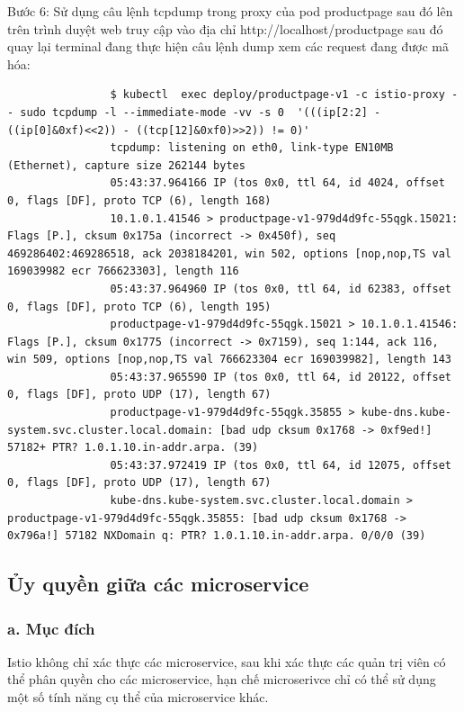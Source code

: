 \documentclass[12pt,a4paper]{report}
\begin{document}
{{				Bước 6: Sử dụng câu lệnh tcpdump trong proxy của pod productpage sau đó lên trên trình duyệt web truy cập vào địa chỉ http://localhost/productpage sau đó quay lại terminal đang thực hiện câu lệnh dump xem các request đang được mã hóa:
				\begin{lstlisting}
				$ kubectl  exec deploy/productpage-v1 -c istio-proxy -- sudo tcpdump -l --immediate-mode -vv -s 0  '(((ip[2:2] - ((ip[0]&0xf)<<2)) - ((tcp[12]&0xf0)>>2)) != 0)'
				tcpdump: listening on eth0, link-type EN10MB (Ethernet), capture size 262144 bytes
				05:43:37.964166 IP (tos 0x0, ttl 64, id 4024, offset 0, flags [DF], proto TCP (6), length 168)
				10.1.0.1.41546 > productpage-v1-979d4d9fc-55qgk.15021: Flags [P.], cksum 0x175a (incorrect -> 0x450f), seq 469286402:469286518, ack 2038184201, win 502, options [nop,nop,TS val 169039982 ecr 766623303], length 116
				05:43:37.964960 IP (tos 0x0, ttl 64, id 62383, offset 0, flags [DF], proto TCP (6), length 195)
				productpage-v1-979d4d9fc-55qgk.15021 > 10.1.0.1.41546: Flags [P.], cksum 0x1775 (incorrect -> 0x7159), seq 1:144, ack 116, win 509, options [nop,nop,TS val 766623304 ecr 169039982], length 143
				05:43:37.965590 IP (tos 0x0, ttl 64, id 20122, offset 0, flags [DF], proto UDP (17), length 67)
				productpage-v1-979d4d9fc-55qgk.35855 > kube-dns.kube-system.svc.cluster.local.domain: [bad udp cksum 0x1768 -> 0xf9ed!] 57182+ PTR? 1.0.1.10.in-addr.arpa. (39)
				05:43:37.972419 IP (tos 0x0, ttl 64, id 12075, offset 0, flags [DF], proto UDP (17), length 67)
				kube-dns.kube-system.svc.cluster.local.domain > productpage-v1-979d4d9fc-55qgk.35855: [bad udp cksum 0x1768 -> 0x796a!] 57182 NXDomain q: PTR? 1.0.1.10.in-addr.arpa. 0/0/0 (39)
				\end{lstlisting}
				
				
		\subsection{Ủy quyền giữa các microservice}
			\subsubsection{a. Mục đích}
			{\hspace{0.6cm}Istio không chỉ xác thực các microservice, sau khi xác thực các quản trị viên có thể phân quyền cho các microservice, hạn chế microserivce chỉ có thể sử dụng một số tính năng cụ thể của microservice khác.}
}}
\end{document}
